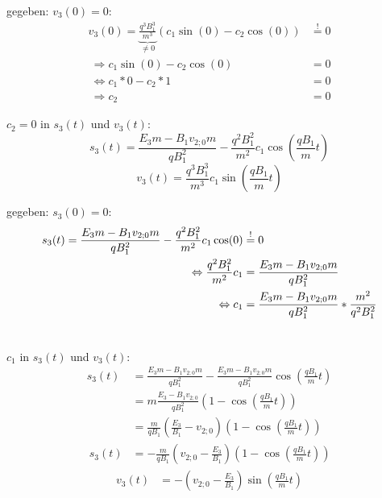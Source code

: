 \documentclass[a4paper, 10pt]{article}
\begin{document}
gegeben: $v_3(0) = 0$:
\begin{equation}
\begin{split}
v_3(0) = \underbrace{\frac{q^3 B_1^3}{m^3}}_{\neq 0} (c_1 \sin(0) - c_2 \cos(0)) &\overset{\text{!}}{=} 0  \\\
\Rightarrow c_1 \sin(0) - c_2 \cos(0) &= 0 \\\
\Leftrightarrow c_1 * 0 - c_2 * 1 &= 0 \\\
\Rightarrow c_2 &= 0
\end{split}
\end{equation}

$c_2=0$ in $s_3(t)$ und $v_3(t)$:
\begin{equation}
s_3(t) = \frac{E_3 m - B_1 v_{2;0} m}{q B_1^2} - \frac{q^2 B_1^2}{m^2} c_1 \cos\left(\frac{q B_1}{m} t\right)
\end{equation}
%
\begin{equation}
v_3(t) = \frac{q^3 B_1^3}{m^3} c_1 \sin\left(\frac{q B_1}{m} t\right)
\end{equation}

gegeben: $s_3(0) = 0$:
\begin{equation}
\begin{split}
s_3(t) = \frac{E_3 m - B_1 v_{2;0} m}{q B_1^2} - \frac{q^2 B_1^2}{m^2} c_1 \cos(0) &\overset{\text{!}}{=} 0 \\\
\Leftrightarrow \hfill \frac{q^2 B_1^2}{m^2} c_1 &= \frac{E_3 m - B_1 v_{2;0} m}{q B_1^2} \\\
\Leftrightarrow \hfill c_1 &= \frac{E_3 m - B_1 v_{2;0} m}{q B_1^2} * \frac{m^2}{q^2 B_1^2} \\\
\end{split}
\end{equation}

$c_1$ in $s_3(t)$ und $v_3(t)$:
\begin{equation}
\begin{split}
s_3(t) 	&= \frac{E_3 m - B_1 v_{2;0} m}{q B_1^2} - \frac{E_3 m - B_1 v_{2;0} m}{q B_1^2} \cos\left(\frac{q B_1}{m} t\right)  \\\
		&= m \frac{E_3 - B_1 v_{2;0}}{q B_1^2} \left( 1 - \cos\left(\frac{q B_1}{m} t\right)\right) \\\
%
		&= 	\frac{m}{q B_1}	\left( \frac{E_3}{B_1} - v_{2;0} \right) \left( 1 - \cos\left(\frac{q B_1}{m} t\right)\right) \\\
%
s_3(t)  &= -\frac{m}{q B_1}	\left( v_{2;0} -\frac{E_3}{B_1} \right) \left( 1 - \cos\left(\frac{q B_1}{m} t\right)\right)
\end{split}
\end{equation}
%
\begin{equation}
\begin{split}
v_3(t) &= -\left(v_{2;0} - \frac{E_3}{B_1}\right) \sin\left(\frac{q B_1}{m} t\right)
\end{split}
\end{equation}
\end{document}
